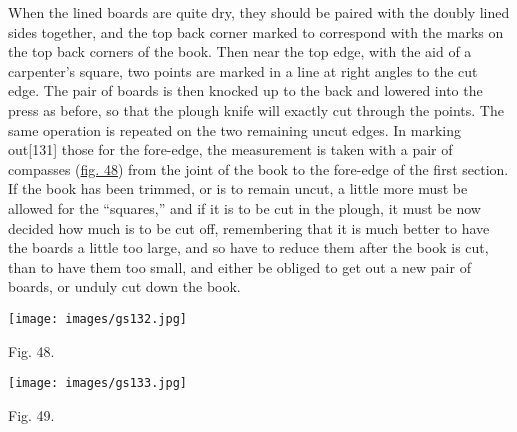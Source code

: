 \documentclass[
]{article}
\begin{document}
When the lined boards are quite dry, they should be paired with the
doubly lined sides together, and the top back corner marked to
correspond with the marks on the top back corners of the book. Then near
the top edge, with the aid of a carpenter's square, two points are
marked in a line at right angles to the cut edge. The pair of boards is
then knocked up to the back and lowered into the press as before, so
that the plough knife will exactly cut through the points. The same
operation is repeated on the two remaining uncut edges. In marking
out{\protect\hypertarget{Page_131}{}{{[}131{]}}} those for the
fore-edge, the measurement is taken with a pair of compasses
(\protect\hyperlink{Fig_48}{fig. 48}) from the joint of the book to the
fore-edge of the first section. If the book has been trimmed, or is to
remain uncut, a little more must be allowed for the ``squares,'' and if
it is to be cut in the plough, it must be now decided how much is to be
cut off, remembering that it is much better to have the boards a little
too large, and so have to reduce them after the book is cut, than to
have them too small, and either be obliged to get out a new pair of
boards, or unduly cut down the book.

\protect\hypertarget{Fig_48}{}{}
\texttt{[image: images/gs132.jpg]}

Fig. 48.

\protect\hypertarget{Fig_49}{}{}
\texttt{[image: images/gs133.jpg]}

Fig. 49.
\end{document}
